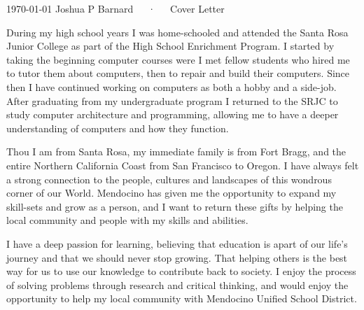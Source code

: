 \documentclass[11pt, a4paper]{awesome-cv}
\begin{document}
	
	\makecvheader[R]
	
	\makecvfooter
	{\today}
	{Joshua P Barnard~~~·~~~Cover Letter}
	{}
	
	\makelettertitle
	
	\begin{cvletter}
		
		During my high school years I was home-schooled and attended the Santa Rosa Junior College as part of the High School Enrichment Program.  I started by taking the beginning computer courses were I met fellow students who hired me to tutor them about computers, then to repair and build their computers.   Since then I have continued working on computers as both a hobby and a side-job.  After graduating from my undergraduate program I returned to the SRJC to study computer architecture and programming, allowing me to have a deeper understanding of computers and how they function. 
		
		Thou I am from Santa Rosa, my immediate family is from Fort Bragg, and the entire Northern California Coast from San Francisco to Oregon.  I have always felt a strong connection to the people, cultures and landscapes of this wondrous corner of our World.
		Mendocino has given me the opportunity to expand my skill-sets and grow as a person, and I want to return these gifts by helping the local community and people with my skills and abilities.
		
		I have a deep passion for learning, believing that education is apart of our life's journey and that we should never stop growing.  That helping others is the best way for us to use our knowledge to contribute back to society.  I enjoy the process of solving problems through research and critical thinking, and would enjoy the opportunity to help my local community with Mendocino Unified School District.
		
	\end{cvletter}
	
	
	\makeletterclosing
	
\end{document}

